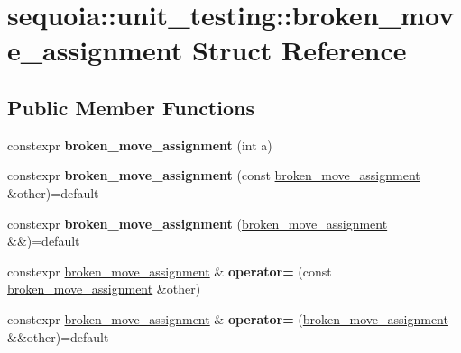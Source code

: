 \hypertarget{structsequoia_1_1unit__testing_1_1broken__move__assignment}{}\section{sequoia\+::unit\+\_\+testing\+::broken\+\_\+move\+\_\+assignment Struct Reference}
\label{structsequoia_1_1unit__testing_1_1broken__move__assignment}
\subsection*{Public Member Functions}
\begin{DoxyCompactItemize}
\item 
\mbox{\label{structsequoia_1_1unit__testing_1_1broken__move__assignment_a889b816cbbd537a0f804a7c8045d1cb3}} 
constexpr {\bfseries broken\+\_\+move\+\_\+assignment} (int a)
\item 
\mbox{\label{structsequoia_1_1unit__testing_1_1broken__move__assignment_a8d96e65a942cd1d2786a96c323b746b8}} 
constexpr {\bfseries broken\+\_\+move\+\_\+assignment} (const \mbox{\hyperlink{structsequoia_1_1unit__testing_1_1broken__move__assignment}{broken\+\_\+move\+\_\+assignment}} \&other)=default
\item 
\mbox{\label{structsequoia_1_1unit__testing_1_1broken__move__assignment_a9b190a4c52cf4257fb82418af3cefd9e}} 
constexpr {\bfseries broken\+\_\+move\+\_\+assignment} (\mbox{\hyperlink{structsequoia_1_1unit__testing_1_1broken__move__assignment}{broken\+\_\+move\+\_\+assignment}} \&\&)=default
\item 
\mbox{\label{structsequoia_1_1unit__testing_1_1broken__move__assignment_a0ecf27f352e373b008913accee4e6336}} 
constexpr \mbox{\hyperlink{structsequoia_1_1unit__testing_1_1broken__move__assignment}{broken\+\_\+move\+\_\+assignment}} \& {\bfseries operator=} (const \mbox{\hyperlink{structsequoia_1_1unit__testing_1_1broken__move__assignment}{broken\+\_\+move\+\_\+assignment}} \&other)
\item 
\mbox{\label{structsequoia_1_1unit__testing_1_1broken__move__assignment_a30c45dcafa6c7f706f12928d89a88327}} 
constexpr \mbox{\hyperlink{structsequoia_1_1unit__testing_1_1broken__move__assignment}{broken\+\_\+move\+\_\+assignment}} \& {\bfseries operator=} (\mbox{\hyperlink{structsequoia_1_1unit__testing_1_1broken__move__assignment}{broken\+\_\+move\+\_\+assignment}} \&\&other)=default
\end{DoxyCompactItemize}
